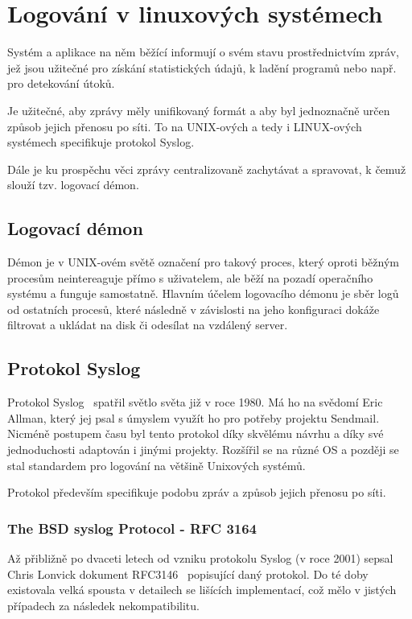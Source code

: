 \documentclass[thesis=B,czech]{FITthesis}[2012/06/26]
\begin{document}
\chapter{Logování v linuxových systémech}
Systém a aplikace na něm běžící informují o svém stavu prostřednictvím zpráv, jež jsou užitečné pro získání statistických údajů, k ladění programů nebo např. pro detekování útoků.

Je užitečné, aby zprávy měly unifikovaný formát a aby byl jednoznačně určen způsob jejich přenosu po síti. To na UNIX-ových a tedy i LINUX-ových systémech specifikuje protokol Syslog.

Dále je ku prospěchu věci zprávy centralizovaně zachytávat a spravovat, k čemuž slouží tzv. logovací démon. 

\section{Logovací démon}
Démon je v UNIX-ovém světě označení pro takový proces, který oproti běžným procesům neintereaguje přímo s uživatelem, ale běží na pozadí operačního systému a funguje samostatně. Hlavním účelem logovacího démonu je sběr logů od ostatních procesů, které následně v závislosti na jeho konfiguraci dokáže filtrovat a ukládat na disk či odesílat na vzdálený server.

\section{Protokol Syslog}
Protokol Syslog~\cite{NetworkAdmSurGuide} spatřil světlo světa již v roce 1980. Má ho na svědomí Eric Allman, který jej psal s úmyslem využít ho pro potřeby projektu Sendmail. Nicméně postupem času byl tento protokol díky skvělému návrhu a díky své jednoduchosti adaptován i jinými projekty. Rozšířil se na různé OS a později se stal standardem pro logování na většině Unixových systémů.

Protokol především specifikuje podobu zpráv a způsob jejich přenosu po síti.

\subsection{The BSD syslog Protocol - RFC 3164}
Až přibližně po dvaceti letech od vzniku protokolu Syslog (v roce 2001) sepsal Chris Lonvick dokument RFC3146~\cite{RFC3164} popisující daný protokol. Do té doby existovala velká spousta v detailech se lišících implementací, což mělo v jistých případech za následek nekompatibilitu.
\end{document}
